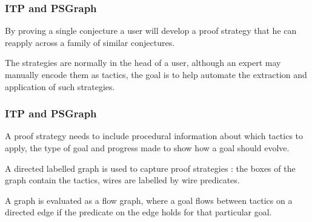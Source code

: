\documentclass[11pt,handout]{beamer}
\begin{document}
\begin{frame}
  \frametitle{ITP and PSGraph}
  By proving a single conjecture a user will develop a proof strategy that he
  can reapply across a family of similar conjectures.


  \vspace*{1cm}

  The strategies are normally in the head of a user, although an expert may
  manually encode them as tactics, the goal is to help automate the extraction
  and application of such strategies.
\end{frame}

\begin{frame}
  \frametitle{ITP and PSGraph}
  A proof strategy needs to include procedural information about which tactics
  to apply, the type of goal and progress made to show how a goal should evolve.
  
  \vspace*{1cm}

  A directed labelled graph is used to capture proof strategies : the boxes of
  the graph contain the tactics, wires are labelled by wire predicates.


  \vspace*{1cm}
  
  A graph is evaluated as a flow graph, where a goal
  flows between tactics on a directed edge if the predicate on the edge holds for
  that particular goal.
\end{frame}
\end{document}
